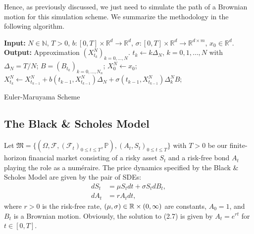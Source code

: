 Hence, as previously discussed, we just need to simulate the path of a Brownian motion for this simulation scheme. We summarize the methodology in the following algorithm.
\begin{algorithm}[H] 
\SetAlgoLined
    \textbf{Input:} $N\in\mathbb{N}$, $T>0$, $b:[0,T]\times \mathbb{R}^{d}\to\mathbb{R}^{d}$, $\sigma:[0,T]\times\mathbb{R}^{d}\to\mathbb{R}^{d\times m}$, $x_{0}\in\mathbb{R}^{d}$.\newline
    \textbf{Output:} Approximation $(X_{t_k}^{N})_{k=0,\dots,N}.$\newline
    $t_{k}\gets k\Delta_{N}$, $k=0,1,\dots,N$ with $\Delta_{N}=T/N$; \newline
    $B=(B_{t_k})_{k=0,\dots,N_{n}}$;\newline
    $X_0^{N}\gets x_0$;\newline
        {$X_{t_k}^{N}\gets X_{t_{k-1}}^{N} + b(t_{k-1},X_{t_{k-1}}^{N})\Delta_{N} + \sigma(t_{k-1},X_{t_{k-1}}^{N})\Delta_{k}^{N}B$;}
\caption{Euler-Maruyama Scheme}
\label{alg:euler}
\end{algorithm}
\subsection{The Black \& Scholes Model}
Let $\mathfrak{M}=\{(\Omega,\mathcal{F},(\mathcal{F}_{t})_{0\leq t\leq T},\mathbb{P}), (A_{t},S_{t})_{0\leq t\leq T}\}$ with $T>0$ be our finite-horizon financial market consisting of a risky asset $S_{t}$ and a risk-free bond $A_{t}$ playing the role as a numéraire. The price dynamics specified by the Black \& Scholes Model are given by the pair of SDEs:
\begin{align}
    dS_{t}&=\mu S_{t}dt+\sigma S_{t}dB_{t},\\
    dA_{t}&=rA_{t}dt,
\end{align}
where $r>0$ is the risk-free rate, $(\mu,\sigma)\in\mathbb{R}\times (0,\infty)$ are constants, $A_{0}=1$, and $B_t$ is a Brownian motion. Obviously, the solution to (2.7) is given by $A_{t}=e^{rt}$ for $t\in [0,T]$.

